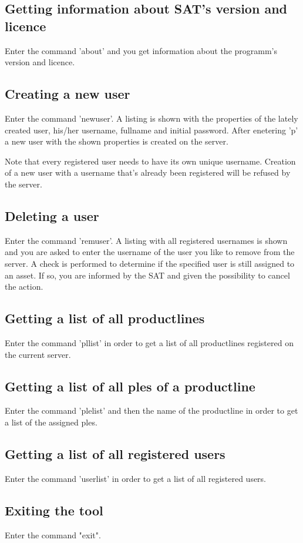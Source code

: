 \subsection{Getting information about SAT's version and licence}
Enter the command 'about' and you get information about the programm's version and licence.

\subsection{Creating a new user}
Enter the command 'newuser'. A listing is shown with the properties of the lately created
user, his/her username, fullname and initial password. After enetering 'p' a new user with
the shown properties is created on the server.\par

Note that every registered user needs to have its own unique username. Creation of a new user 
with a username that's already been registered will be refused by the server.

\subsection{Deleting a user}
Enter the command 'remuser'. A listing with all registered usernames is shown and you are
asked to enter the username of the user you like to remove from the server. A check is
performed to determine if the specified user is still assigned to an asset. If so, you are
informed by the SAT and given the possibility to cancel the action.

\subsection{Getting a list of all productlines}
Enter the command 'pllist' in order to get a list of all productlines registered on the 
current server.

\subsection{Getting a list of all ples of a productline}
Enter the command 'plelist' and then the name of the productline in order to get a list
 of the assigned ples.
 
\subsection{Getting a list of all registered users}
Enter the command 'userlist' in order to get a list of all registered users.

\subsection{Exiting the tool}
Enter the command "exit".